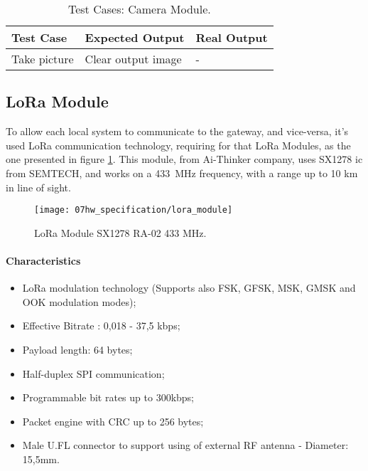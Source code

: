 \begin{table}[H]
	\centering
	\resizebox{\columnwidth}{!}
	{
	\begin{tabular}{|m{3cm}|m{5cm}||m{5cm}|}
		\hline
		\textbf{Test Case} & \textbf{Expected Output} & \textbf{Real Output}
		\\\hline\hline
		Take picture & Clear output image & -
		\\\hline
	\end{tabular}
	}
	\caption{Test Cases: Camera Module.}
	\label{table:test_camera}
\end{table}


\clearpage
\subsection{LoRa Module}
To allow each local system to communicate to the gateway, and vice-versa, it's used LoRa communication technology, requiring for that LoRa Modules, as the one presented in figure \ref{fig:lora_module}. This module, from Ai-Thinker company, uses SX1278 \ac{ic} from SEMTECH, and works on a 433~MHz frequency, with a range up to 10 km in line of sight. \cite{sx1278} \cite{lora_module}

\begin{figure}[H]
	\centering
	\texttt{[image: 07hw\_specification/lora\_module]}
	\caption{LoRa Module SX1278 RA-02 433 MHz.}
	\label{fig:lora_module}
\end{figure}

\paragraph*{Characteristics}
\begin{itemize}
	\item LoRa modulation technology (Supports also FSK, GFSK, MSK, GMSK and OOK modulation modes);
	\item Effective Bitrate : 0,018 - 37,5 kbps;
	\item Payload length: 64 bytes;
	\item Half-duplex SPI communication;
	\item Programmable bit rates up to 300kbps;
	\item Packet engine with CRC up to 256 bytes;
	\item Male U.FL connector to support using of external RF antenna - Diameter: 15,5mm.
\end{itemize}

